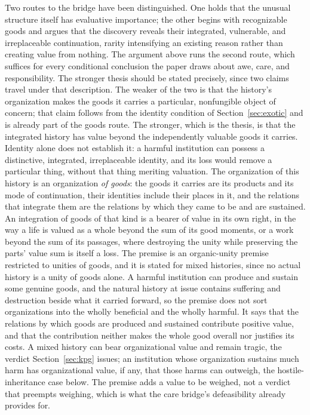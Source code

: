 Two routes to the bridge have been distinguished. One holds that the unusual
structure itself has evaluative
importance; the other begins with recognizable goods and argues that the
discovery reveals their integrated, vulnerable, and irreplaceable
continuation, rarity intensifying an existing reason rather than creating
value from nothing. The argument above runs the second route, which suffices
for every conditional conclusion the paper draws about awe, care, and
responsibility. The stronger thesis should be stated precisely, since two
claims travel under that description. The weaker of the
two is that the history's organization makes the goods it carries a
particular, nonfungible object of concern; that claim follows from the
identity condition of Section~\ref{sec:exotic} and is already part of the
goods route. The stronger, which is the thesis, is that the integrated
history has value beyond the independently valuable goods it carries. Identity
alone does not establish it: a harmful institution can possess a distinctive,
integrated, irreplaceable identity, and its loss would remove a particular
thing, without that thing meriting valuation. The organization of this
history is an organization
\emph{of goods}: the goods it carries are its products and its mode of
continuation, their identities include their places in it, and the relations
that integrate them are the relations by which they came to be and are
sustained. An integration of goods of that kind is a bearer of value in its
own right, in the way a life is valued as a whole beyond the sum of its good
moments, or a work beyond the sum of its passages, where destroying the unity
while preserving the parts' value sum is itself a loss. The premise is an
organic-unity premise restricted to unities of goods, and it is stated for
mixed histories, since no actual history is a unity of goods alone. A harmful
institution can produce and sustain some genuine goods, and the natural
history at issue contains suffering and destruction beside what it carried
forward, so the premise does not sort organizations into the wholly
beneficial and the wholly harmful. It says that the relations by which goods
are produced and sustained contribute positive value, and that the
contribution neither makes the whole good overall nor justifies its costs. A
mixed history can bear organizational value and remain tragic, the verdict
Section~\ref{sec:kpg} issues; an institution whose organization sustains
much harm has organizational value, if any, that those harms can outweigh,
the hostile-inheritance case below. The premise adds a
value to be weighed, not a verdict that preempts weighing, which is what the
care bridge's defeasibility already provides for.

